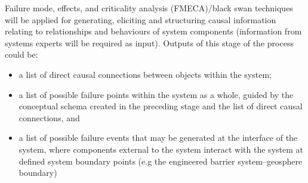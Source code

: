 \newpage\noindent
Failure mode, effects, and criticality analysis (FMECA)/black swan techniques will be applied for generating, eliciting and structuring causal information relating to relationships and behaviours of system components (information from systems experts will be required as input).
\newl Outputs of this stage of the process could be:
\begin{itemize}[noitemsep]
\item a list of direct causal connections between objects within the system;
\item a list of possible failure points within the system as a whole, guided by the conceptual schema created in the preceding stage and the list of direct causal connections, and 
\item a list of possible failure events that may be generated at the interface of the system, where components external to the system interact with the system at defined system boundary points (e.g the engineered barrier system--geosphere boundary)
\end{itemize}

